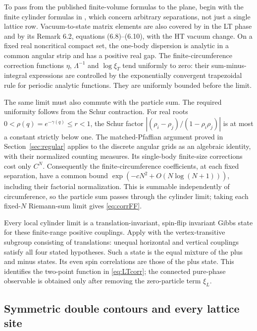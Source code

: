 \documentclass[11pt]{article}
\numberwithin{equation}{section}
\theoremstyle{definition}
\begin{document}
To pass from the published finite-volume formulas to the plane, begin
with the finite cylinder formulas in \cite[(35)--(39)]{BL}, which concern arbitrary separations,
not just a single lattice row. Vacuum-to-state matrix elements are also
covered by \cite[Theorem 6.1]{IL} in the LT phase and by its
Remark 6.2, equations (6.8)--(6.10), with the HT vacuum change.
On a fixed real noncritical compact set, the one-body dispersion is
analytic in a common angular strip and has a positive real gap. The
finite-circumference correction functions $\eta$, $\Lambda^{-1}$ and
$\log\xi_T$ tend uniformly to zero: their sum-minus-integral expressions
are controlled by the exponentially convergent trapezoidal rule for
periodic analytic functions. They are uniformly bounded before the limit.

The same limit must also commute with the particle sum. The required
uniformity follows from the Schur contraction. For real roots
$0<\rho(q)=e^{-\gamma(q)}\le r<1$, the Schur factor
$|(\rho_i-\rho_j)/(1-\rho_i\rho_j)|$ is at most a constant strictly below
one. The matched-Pfaffian argument proved in
Section~\ref{sec:regular} applies to the discrete angular grids as an
algebraic identity, with their normalized counting measures. Its
single-body finite-size corrections cost only $C^N$. Consequently the
finite-circumference coefficients, at each fixed separation, have a
common bound $\exp(-cN^2+O(N\log(N+1)))$, including their factorial
normalization. This is summable independently of circumference, so the
particle sum passes through the cylinder limit; taking each fixed-$N$
Riemann-sum limit gives \eqref{eq:corrFF}.

Every local cylinder limit is a translation-invariant, spin-flip invariant
Gibbs state for these finite-range positive couplings. Apply
\cite[Theorem 1]{Raoufi} with the vertex-transitive subgroup consisting
of translations: unequal horizontal and vertical couplings satisfy all
four stated hypotheses. Such a state is the equal mixture of the plus
and minus states. Its even spin correlations are those of the plus
state. This identifies the two-point function in \eqref{eq:LTcorr};
the connected pure-phase observable is obtained only after removing
the zero-particle term $\xi_L$.

\subsection{Symmetric double contours and every lattice site}
\end{document}
